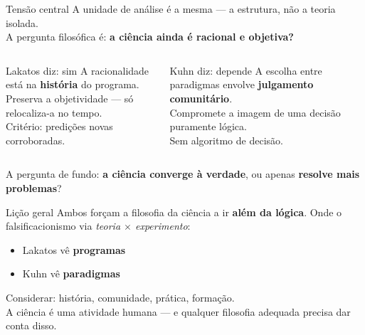 \documentclass[aspectratio=169]{beamer}
\newcommand{\impt}[1]{\textcolor{maccent}{\textbf{#1}}}
\newcommand{\ntc}[1]{\textcolor{mprimary}{#1}}
\begin{document}
\begin{frame}{Tensão central}
A unidade de análise é a mesma --- a estrutura, não a teoria isolada. \\
A pergunta filosófica é: \impt{a ciência ainda é racional e objetiva?}
\vspace{0.1cm}
\pause
\begin{columns}[t]
\begin{block}{Lakatos diz: sim}
A racionalidade está na \impt{história} do programa. \\[0.2cm]
\ntc{Preserva} a objetividade --- só relocaliza-a no tempo. \\[0.2cm]
Critério: predições novas corroboradas.
\end{block}

\pause
\begin{block}{Kuhn diz: depende}
A escolha entre paradigmas envolve \impt{julgamento comunitário}. \\[0.2cm]
\ntc{Compromete} a imagem de uma decisão puramente lógica. \\[0.2cm]
Sem algoritmo de decisão.
\end{block}
\end{columns}
\vspace{0.5cm}
\pause
\begin{alertblock}{}
\centering
A pergunta de fundo: \impt{a ciência converge à verdade}, ou apenas \impt{resolve mais problemas}?
\end{alertblock}
\end{frame}
\begin{frame}{Lição geral}
Ambos forçam a filosofia da ciência a ir \impt{além da lógica}.
\vspace{0.4cm}
\pause
Onde o falsificacionismo via \emph{teoria $\times$ experimento}:
\vspace{0.2cm}
\begin{itemize}
  \item Lakatos vê \impt{programas}
  \item Kuhn vê \impt{paradigmas}
\end{itemize}
\pause
\ntc{Considerar:} história, comunidade, prática, formação. \\[0.3cm]
A ciência é uma atividade humana --- e qualquer filosofia adequada precisa dar conta disso.
\end{frame}
\end{document}
